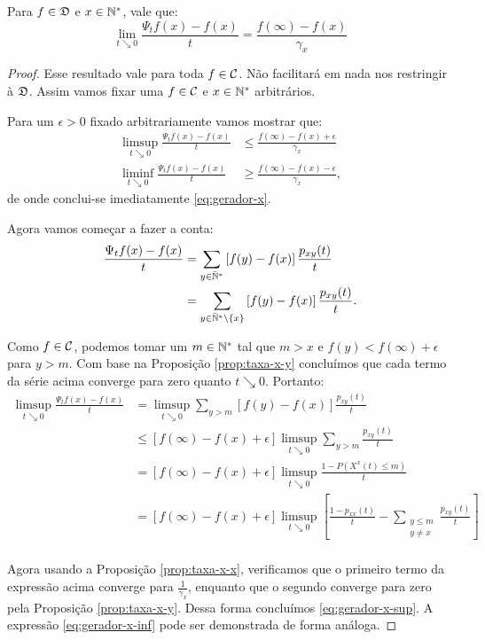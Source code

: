 \begin{proposicao}
  \label{prop:gerador-x}
  Para $f \in {\mathfrak{D}}$ e $x \in {\mathbb{N^*}}$, vale que:
  \begin{equation}
    \label{eq:gerador-x}
    \lim_{t \searrow 0} \frac{\Psi_t f(x) - f(x)}{t} = \frac{f(\infty)
    - f(x)}{\gamma_x}
  \end{equation}
\end{proposicao}

\begin{proof}
  Esse resultado vale para toda $f \in {\mathcal{C}}$. Não facilitará em nada
  nos restringir à ${\mathfrak{D}}$. Assim vamos fixar uma $f \in {\mathcal{C}}$ e $x \in {\mathbb{N^*}}$
  arbitrários.

  Para um $\epsilon > 0$ fixado arbitrariamente vamos mostrar que:
  \begin{align}
    \label{eq:gerador-x-sup}
    \limsup_{t \searrow 0} \frac{\Psi_t f (x) - f(x)}{t} &\leq
    \frac{f(\infty) - f(x) + \epsilon}{\gamma_x}\\
    \label{eq:gerador-x-inf}
    \liminf_{t \searrow 0} \frac{\Psi_t f (x) - f(x)}{t} &\geq
    \frac{f(\infty) - f(x) - \epsilon}{\gamma_x}, 
  \end{align}
  de onde conclui-se imediatamente \eqref{eq:gerador-x}.

  Agora vamos começar a fazer a conta:
  \begin{align*}
    \frac{\Psi_t f(x) - f(x)}{t}
    &= \sum_{y \in {\mathbb{\bar{N}^*}}} \left[ f(y) - f(x) \right] \frac{p_{x y}(t)}{t}\\
    &=
    \sum_{y \in {\mathbb{\bar{N}^*}}\setminus\{x\}} \left[ f(y) - f(x) \right] \frac{p_{x y}(t)}{t}.
  \end{align*}


  Como $f \in {\mathcal{C}}$, podemos tomar um $m \in {\mathbb{N^*}}$ tal que $m > x$ e
  $f(y) < f(\infty) + \epsilon$ para $y > m$. Com base na Proposição
  \ref{prop:taxa-x-y} concluímos que cada termo da série acima
  converge para zero quanto $t \searrow 0$. Portanto:
  \begin{align*}
    \limsup_{t \searrow 0}
    \frac{\Psi_t f(x) - f(x)}{t}
    &= \limsup_{t \searrow 0}
    \sum_{y > m} \left[ f(y) - f(x) \right] \frac{p_{x y}(t)}{t}\\
    &\leq \left[ f(\infty) - f(x) + \epsilon \right] \limsup_{t \searrow 0} 
    \sum_{y > m} \frac{p_{x y}(t)}{t}\\
    &= \left[ f(\infty) - f(x) + \epsilon \right] \limsup_{t \searrow 0}
    \frac{1 - P\left( X^x(t) \leq m \right)}{t}\\
    &= \left[ f(\infty) - f(x) + \epsilon \right] \limsup_{t \searrow 0}
    \left[
      \frac{1 - p_{x x}(t)}{t}
      - \sum_{\substack{y \leq m \\ y\neq x}} \frac{p_{x y}(t)}{t}
    \right]\\
  \end{align*}

  Agora usando a Proposição \ref{prop:taxa-x-x}, verificamos que o
  primeiro termo da expressão acima converge para
  $\frac{1}{\gamma_x}$, enquanto que o segundo converge para zero pela
  Proposição \ref{prop:taxa-x-y}. Dessa forma concluímos
  \eqref{eq:gerador-x-sup}. A expressão \eqref{eq:gerador-x-inf} pode
  ser demonstrada de forma análoga.
\end{proof}


